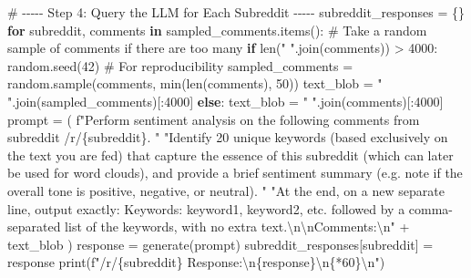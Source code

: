 \documentclass[
  12pt,
  letterpaper,
  DIV=11,
  numbers=noendperiod]{scrartcl}
\newenvironment{Shaded}{\begin{snugshade}}{\end{snugshade}}
\newcommand{\BuiltInTok}[1]{\textcolor[rgb]{0.00,0.23,0.31}{#1}}
\newcommand{\CharTok}[1]{\textcolor[rgb]{0.13,0.47,0.30}{#1}}
\newcommand{\CommentTok}[1]{\textcolor[rgb]{0.37,0.37,0.37}{#1}}
\newcommand{\ControlFlowTok}[1]{\textcolor[rgb]{0.00,0.23,0.31}{\textbf{#1}}}
\newcommand{\DecValTok}[1]{\textcolor[rgb]{0.68,0.00,0.00}{#1}}
\newcommand{\KeywordTok}[1]{\textcolor[rgb]{0.00,0.23,0.31}{\textbf{#1}}}
\newcommand{\NormalTok}[1]{\textcolor[rgb]{0.00,0.23,0.31}{#1}}
\newcommand{\OperatorTok}[1]{\textcolor[rgb]{0.37,0.37,0.37}{#1}}
\newcommand{\SpecialCharTok}[1]{\textcolor[rgb]{0.37,0.37,0.37}{#1}}
\newcommand{\SpecialStringTok}[1]{\textcolor[rgb]{0.13,0.47,0.30}{#1}}
\newcommand{\StringTok}[1]{\textcolor[rgb]{0.13,0.47,0.30}{#1}}
\begin{document}
\begin{Shaded}
\begin{Highlighting}[]
\CommentTok{\# {-}{-}{-}{-}{-} Step 4: Query the LLM for Each Subreddit {-}{-}{-}{-}{-}}
\NormalTok{subreddit\_responses }\OperatorTok{=}\NormalTok{ \{\}}
\ControlFlowTok{for}\NormalTok{ subreddit, comments }\KeywordTok{in}\NormalTok{ sampled\_comments.items():}
    \CommentTok{\# Take a random sample of comments if there are too many}
    \ControlFlowTok{if} \BuiltInTok{len}\NormalTok{(}\StringTok{" "}\NormalTok{.join(comments)) }\OperatorTok{\textgreater{}} \DecValTok{4000}\NormalTok{:}
\NormalTok{        random.seed(}\DecValTok{42}\NormalTok{)  }\CommentTok{\# For reproducibility}
\NormalTok{        sampled\_comments }\OperatorTok{=}\NormalTok{ random.sample(comments, }\BuiltInTok{min}\NormalTok{(}\BuiltInTok{len}\NormalTok{(comments), }\DecValTok{50}\NormalTok{))}
\NormalTok{        text\_blob }\OperatorTok{=} \StringTok{" "}\NormalTok{.join(sampled\_comments)[:}\DecValTok{4000}\NormalTok{]}
    \ControlFlowTok{else}\NormalTok{:}
\NormalTok{        text\_blob }\OperatorTok{=} \StringTok{" "}\NormalTok{.join(comments)[:}\DecValTok{4000}\NormalTok{]}
\NormalTok{    prompt }\OperatorTok{=}\NormalTok{ (}
        \SpecialStringTok{f"Perform sentiment analysis on the following comments from subreddit /r/}\SpecialCharTok{\{}\NormalTok{subreddit}\SpecialCharTok{\}}\SpecialStringTok{. "}
        \StringTok{"Identify 20 unique keywords (based exclusively on the text you are fed) that capture the essence of this subreddit (which can later be used for word clouds), and provide a brief sentiment summary (e.g. note if the overall tone is positive, negative, or neutral). "}
        \StringTok{"At the end, on a new separate line, output exactly: \textquotesingle{}Keywords: keyword1, keyword2, etc.\textquotesingle{} followed by a comma{-}separated list of the keywords, with no extra text.}\CharTok{\textbackslash{}n\textbackslash{}n}\StringTok{Comments:}\CharTok{\textbackslash{}n}\StringTok{"} 
        \OperatorTok{+}\NormalTok{ text\_blob}
\NormalTok{    )}
\NormalTok{    response }\OperatorTok{=}\NormalTok{ generate(prompt)}
\NormalTok{    subreddit\_responses[subreddit] }\OperatorTok{=}\NormalTok{ response}
    \BuiltInTok{print}\NormalTok{(}\SpecialStringTok{f"/r/}\SpecialCharTok{\{}\NormalTok{subreddit}\SpecialCharTok{\}}\SpecialStringTok{ Response:}\CharTok{\textbackslash{}n}\SpecialCharTok{\{}\NormalTok{response}\SpecialCharTok{\}}\CharTok{\textbackslash{}n}\SpecialCharTok{\{}\StringTok{\textquotesingle{}{-}\textquotesingle{}}\OperatorTok{*}\DecValTok{60}\SpecialCharTok{\}}\CharTok{\textbackslash{}n}\SpecialStringTok{"}\NormalTok{)}


\end{Highlighting}
\end{Shaded}
\end{document}
